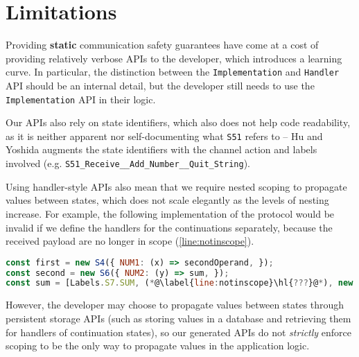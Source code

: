 \section{Limitations}
\label{section:nodelimitations}

Providing \textbf{static} communication safety guarantees have
come at a cost of providing relatively verbose APIs to the developer,
which introduces a learning curve. In particular,
the distinction between the \texttt{Implementation} and
\texttt{Handler} API should be an internal detail, but
the developer still needs to use the \texttt{Implementation} API
in their logic. 

Our APIs also rely on state identifiers, which also
does not help code readability, as it is neither apparent nor
self-documenting what \texttt{S51} refers to -- Hu and Yoshida
\cite{Hybrid2016} augments the state identifiers with the channel
action and labels involved (e.g. 
\texttt{S51_Receive__Add_Number__Quit_String}).

Using handler-style APIs also mean that we require
nested scoping to propagate values between states,
which does not scale elegantly as the levels of nesting
increase. For example, the following implementation of
the  protocol would be invalid if
we define the handlers for the continuations separately,
because the received payload are no longer in scope
(\cref{line:notinscope}).

\begin{lstlisting}[language=javascript]
const first = new S4({ NUM1: (x) => secondOperand, });
const second = new S6({ NUM2: (y) => sum, });
const sum = [Labels.S7.SUM, (*@\label{line:notinscope}\hl{???}@*), new S5()];
\end{lstlisting}

However, the developer may choose to propagate values
between states through persistent storage APIs (such as
storing values in a database and retrieving them for
handlers of continuation states), so our generated APIs
do not \textit{strictly} enforce scoping to be the only way to
propagate values in the application logic.